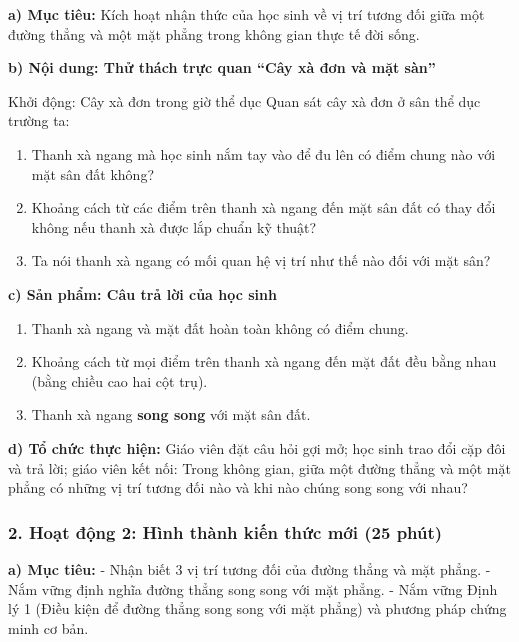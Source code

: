 \documentclass[12pt, a4paper]{article}
\begin{document}
\noindent \textbf{a) Mục tiêu:}
Kích hoạt nhận thức của học sinh về vị trí tương đối giữa một đường thẳng và một mặt phẳng trong không gian thực tế đời sống.

\noindent \textbf{b) Nội dung: Thử thách trực quan ``Cây xà đơn và mặt sàn''}
\begin{pedabox}{Khởi động: Cây xà đơn trong giờ thể dục}
Quan sát cây xà đơn ở sân thể dục trường ta:
\begin{enumerate}[leftmargin=0.6cm]
    \item Thanh xà ngang mà học sinh nắm tay vào để đu lên có điểm chung nào với mặt sân đất không?
    \item Khoảng cách từ các điểm trên thanh xà ngang đến mặt sân đất có thay đổi không nếu thanh xà được lắp chuẩn kỹ thuật?
    \item Ta nói thanh xà ngang có mối quan hệ vị trí như thế nào đối với mặt sân?
\end{enumerate}
\end{pedabox}

\noindent \textbf{c) Sản phẩm: Câu trả lời của học sinh}
\begin{enumerate}[leftmargin=0.6cm]
    \item Thanh xà ngang và mặt đất hoàn toàn không có điểm chung.
    \item Khoảng cách từ mọi điểm trên thanh xà ngang đến mặt đất đều bằng nhau (bằng chiều cao hai cột trụ).
    \item Thanh xà ngang \textbf{song song} với mặt sân đất.
\end{enumerate}

\noindent \textbf{d) Tổ chức thực hiện:}
Giáo viên đặt câu hỏi gợi mở; học sinh trao đổi cặp đôi và trả lời; giáo viên kết nối: Trong không gian, giữa một đường thẳng và một mặt phẳng có những vị trí tương đối nào và khi nào chúng song song với nhau?

\subsubsection*{2. Hoạt động 2: Hình thành kiến thức mới (25 phút)}

\noindent \textbf{a) Mục tiêu:}
- Nhận biết 3 vị trí tương đối của đường thẳng và mặt phẳng.
- Nắm vững định nghĩa đường thẳng song song với mặt phẳng.
- Nắm vững Định lý 1 (Điều kiện để đường thẳng song song với mặt phẳng) và phương pháp chứng minh cơ bản.
\end{document}
